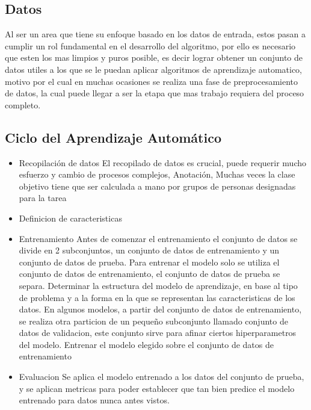 \documentclass[a4paper,12pt,spanish]{book}
\begin{document}
    \subsection{Datos}
      Al ser un area que tiene su enfoque basado en los datos de entrada, estos pasan a cumplir un rol fundamental en el desarrollo del algoritmo, por ello es necesario que 
      esten los mas limpios y puros posible, es decir lograr obtener un conjunto de datos utiles a los que se le puedan aplicar algoritmos de aprendizaje automatico, 
      motivo por el cual en muchas ocasiones se realiza una fase de preprocesamiento de datos, la cual puede llegar a ser la etapa que mas trabajo requiera del proceso completo. 


    \subsection{Ciclo del Aprendizaje Automático}
      \begin{itemize}
	\item Recopilación de datos
	  El recopilado de datos es crucial, puede requerir mucho esfuerzo y cambio de procesos complejos, 
	  Anotación, Muchas veces la clase objetivo tiene que ser calculada a mano por grupos de personas designadas para la tarea
	\item Definicion de caracteristicas
	\item Entrenamiento
	  Antes de comenzar el entrenamiento el conjunto de datos se divide en 2 subconjuntos, un conjunto de datos de entrenamiento y un conjunto de datos de prueba. 
	  Para entrenar el modelo solo se utiliza el conjunto de datos de entrenamiento, el conjunto de datos de prueba se separa.
	  Determinar la estructura del modelo de aprendizaje, en base al tipo de problema y a la forma en la que se representan las caracteristicas de los datos.
	  En algunos modelos, a partir del conjunto de datos de entrenamiento, se realiza otra particion de un pequeño subconjunto llamado conjunto de datos de validacion, este conjunto sirve 
	  para afinar ciertos hiperparametros del modelo.
	  Entrenar el modelo elegido sobre el conjunto de datos de entrenamiento
	\item Evaluacion
	  Se aplica el modelo entrenado a los datos del conjunto de prueba, y se aplican metricas para poder establecer que tan bien predice el modelo entrenado para datos nunca antes vistos.
    \end{itemize}
\end{document}
